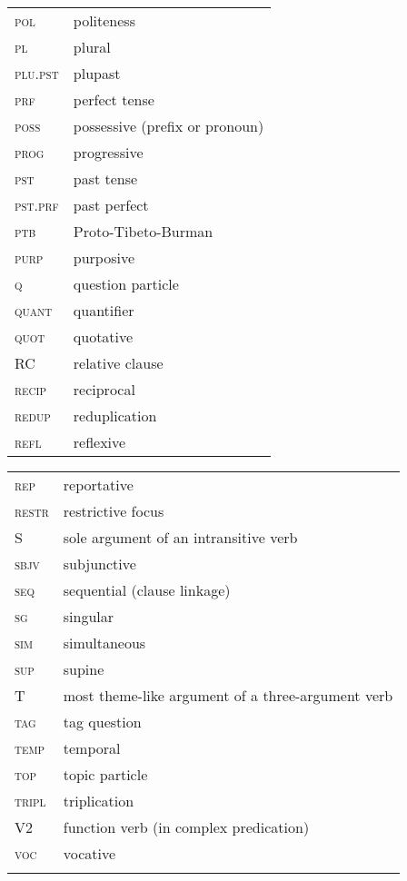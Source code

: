 \begin{multicols}{2}
\begin{tabular}{lp{4.5cm}} 
\textsc{pol} &  politeness\\
\textsc{pl} &  		 plural\\
\textsc{plu.pst} &  plupast\\
\textsc{prf} &  perfect tense\\
\textsc{poss} &   possessive (prefix or pronoun)\\
\textsc{prog} &   progressive\\
\textsc{pst} &   past tense\\
\textsc{pst.prf} &   past perfect\\
\textsc{ptb} &   Proto-Tibeto-Burman\\
\textsc{purp} &  purposive\\
\textsc{q} &   question particle\\
\textsc{quant} &   quantifier\\
\textsc{quot} &   quotative\\
\textsc{RC} &   relative clause\\
\textsc{recip} &   reciprocal\\
\textsc{redup} &  reduplication\\
\textsc{refl} &  reflexive\\
\end{tabular}

\begin{tabular}{lp{4.5cm}} 
\textsc{rep} &   reportative\\
\textsc{restr} &  restrictive focus\\
S 	& sole argument of an intransitive verb\\
\textsc{sbjv} &   subjunctive\\
\textsc{seq} &  sequential (clause linkage)\\
\textsc{sg} &  		 singular\\
\textsc{sim} &   simultaneous\\
\textsc{sup} &   supine\\
T  & most theme-like argument of a three-argument verb\\
\textsc{tag} &   tag question\\
\textsc{temp} &  temporal\\
\textsc{top} &   topic particle\\
\textsc{tripl} &  triplication\\
\textsc{V2} &  function verb (in complex predication)\\
\textsc{voc} &  vocative\\
\setlength{\parindent}{10pt}
\end{tabular}
\end{multicols}

